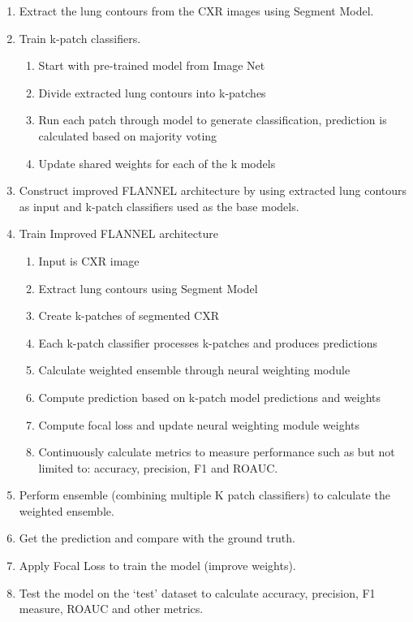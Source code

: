 \documentclass{sigkddExp}
\begin{document}
\begin{enumerate}
    \item Extract the lung contours from the CXR images using Segment Model.
    \item Train k-patch classifiers.
    \begin{enumerate}
        \item Start with pre-trained model from Image Net
        \item Divide extracted lung contours into k-patches
        \item Run each patch through model to generate classification,
        prediction is calculated based on majority voting
        \item Update shared weights for each of the k models
    \end{enumerate}
    \item Construct improved FLANNEL architecture by using extracted lung
    contours as input and k-patch classifiers used as the base models.
    \item Train Improved FLANNEL architecture
    \begin{enumerate}
        \item Input is CXR image
        \item Extract lung contours using Segment Model
        \item Create k-patches of segmented CXR
        \item Each k-patch classifier processes k-patches and produces predictions
        \item Calculate weighted ensemble through neural weighting module
        \item Compute prediction based on k-patch model predictions and weights
        \item Compute focal loss and update neural weighting module weights
        \item Continuously calculate metrics to measure performance such as but
        not limited to: accuracy, precision, F1 and ROAUC.
    \end{enumerate}
    \item Perform ensemble (combining multiple K patch classifiers) to calculate the weighted ensemble.
    \item Get the prediction and compare with the ground truth.
    \item Apply Focal Loss to train the model (improve weights).
    \item Test the model on the ‘test’ dataset to calculate accuracy, precision, F1 measure, ROAUC and other metrics.
\end{enumerate}
\end{document}
